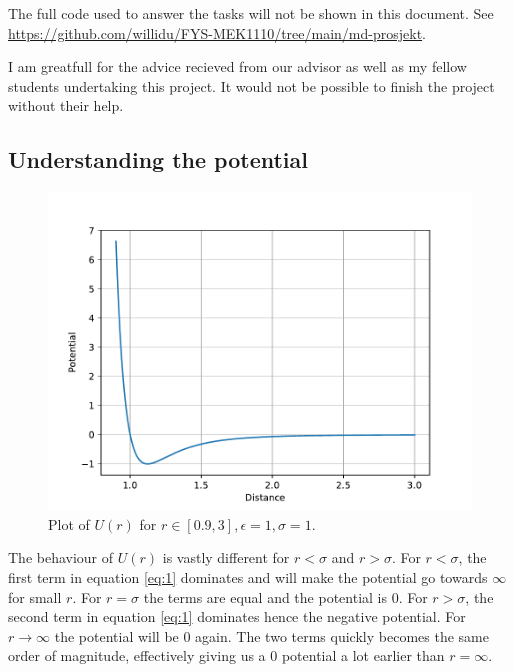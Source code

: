\documentclass[a4paper,10pt,english]{article}
\begin{document}
The full code used to answer the tasks will not be shown in this document. See \url{https://github.com/willidu/FYS-MEK1110/tree/main/md-prosjekt}.

I am greatfull for the advice recieved from our advisor as well as my fellow students undertaking this project. It would not be possible to finish the project without their help. 

\subsection{Understanding the potential} \label{1a}

\begin{figure}[h!]
    \centering 
    \includegraphics[scale=.65]{../figures/1_a_i.pdf} 
    \caption{Plot of $U(r)$ for $r\in[0.9, 3], \epsilon=1, \sigma=1$.}
    \label{fig:plot1}
\end{figure}

The behaviour of $U(r)$ is vastly different for $r<\sigma$ and $r>\sigma$. For $r<\sigma$, the first term in equation \ref{eq:1} dominates and will make the potential go towards $\infty$ for small $r$. For $r=\sigma$ the terms are equal and the potential is 0. For $r>\sigma$, the second term in equation \ref{eq:1} dominates hence the negative potential. For $r\to \infty$ the potential will be 0 again. The two terms quickly becomes the same order of magnitude, effectively giving us a 0 potential a lot earlier than $r=\infty$.
\end{document}
